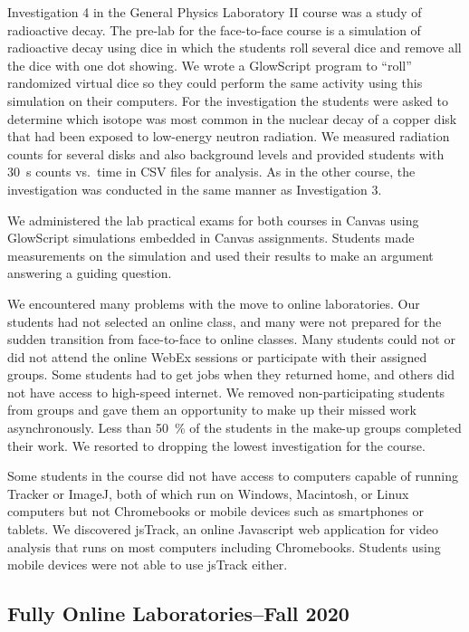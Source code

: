 \documentclass[aip, numerical, preprint]{revtex4-2}
\begin{document}
Investigation 4 in the General Physics Laboratory II course was a study of radioactive decay. The pre-lab for the face-to-face course is a simulation of radioactive decay using dice in which the students roll several dice and remove all the dice with one dot showing. We wrote a GlowScript\citep{glowscript} program to ``roll'' randomized virtual dice so they could perform the same activity using this simulation on their computers. For the investigation the students were asked to determine which isotope was most common in the nuclear decay of a copper disk that had been exposed to low-energy neutron radiation. We measured radiation counts for several disks and also background levels and provided students with \SI{30}{s} counts vs.\ time in CSV files for analysis. As in the other course, the investigation was conducted in the same manner as Investigation 3.


We administered the lab practical exams for both courses in Canvas using GlowScript simulations embedded in Canvas assignments. Students made measurements on the simulation and used their results to make an argument answering a guiding question.

We encountered many problems with the move to online laboratories. Our students had not selected an online class, and many were not prepared for the sudden transition from face-to-face to online classes. Many students could not or did not attend the online WebEx sessions or participate with their assigned groups. Some students had to get jobs when they returned home, and others did not have access to high-speed internet. We removed non-participating students from groups and gave them an opportunity to make up their missed work asynchronously. Less than \SI{50}{\percent} of the students in the make-up groups completed their work. We resorted to dropping the lowest investigation for the course.

Some students in the course did not have access to computers capable of running Tracker or ImageJ, both of which run on Windows, Macintosh, or Linux computers but not Chromebooks or mobile devices such as smartphones or tablets. We discovered jsTrack\citep{jstrack}, an online Javascript web application for video analysis that runs on most computers including Chromebooks. Students using mobile devices were not able to use jsTrack either.

\subsection{Fully Online Laboratories--Fall 2020}
\end{document}
